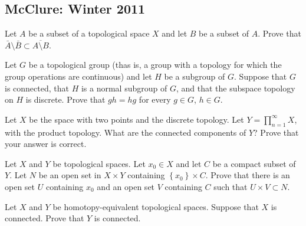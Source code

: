 \subsection{McClure: Winter 2011}
\setcounter{exercise}{0}

\begin{problem}
  Let $A$ be a subset of a topological space $X$ and let $B$ be a subset of
  $A$. Prove that $\bar A\setminus\bar B\subset\overline{A\setminus B}$.
\end{problem}
\begin{solution}
\end{solution}

\begin{problem}
  Let $G$ be a topological group (thas is, a group with a topology for
  which the group operations are continuous) and let $H$ be a subgroup of
  $G$. Suppose that $G$ is connected, that $H$ is a normal subgroup of $G$,
  and that the subspace topology on $H$ is discrete. Prove that $gh=hg$ for
  every $g\in G$, $h\in G$.
\end{problem}
\begin{solution}
\end{solution}

\begin{problem}
  Let $X$ be the space with two points and the discrete topology. Let
  $Y=\prod_{n=1}^\infty X$, with the product topology. What are the
  connected components of $Y$? Prove that your answer is correct.
\end{problem}
\begin{solution}
\end{solution}

\begin{problem}
  Let $X$ and $Y$ be topological spaces. Let $x_0\in X$ and let $C$ be a
  compact subset of $Y$. Let $N$ be an open set in $X\times Y$ containing
  $\left\{x_0\right\}\times C$. Prove that there is an open set $U$
  containing $x_0$ and an open set $V$ containing $C$ such that
  $U\times V\subset N$.
\end{problem}
\begin{solution}
\end{solution}

\begin{problem}
  Let $X$ and $Y$ be homotopy-equivalent topological spaces. Suppose that
  $X$ is connected. Prove that $Y$ is connected.
\end{problem}
\begin{solution}
\end{solution}

